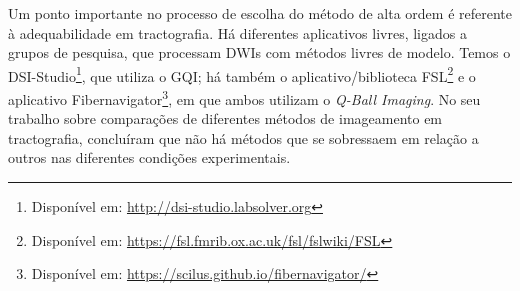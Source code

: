 \documentclass[
    12pt,                %
    oneside,            %
    a4paper,            %
    english,            %
    french,                %
    spanish,            %
    brazil                %
    ]{abntex2}
\begin{document}
Um ponto importante no processo de escolha do método de alta ordem é referente à adequabilidade em tractografia. Há diferentes aplicativos livres, ligados a grupos de pesquisa, que processam DWIs com métodos livres de modelo. Temos o DSI-Studio\footnote{Disponível em: \url{http://dsi-studio.labsolver.org}}, que utiliza o GQI; há também o aplicativo/biblioteca FSL\footnote{Disponível em: \url{https://fsl.fmrib.ox.ac.uk/fsl/fslwiki/FSL}} e o aplicativo Fibernavigator\footnote{Disponível em: \url{https://scilus.github.io/fibernavigator/}}, em que ambos utilizam o \textit{Q-Ball Imaging}. No seu trabalho sobre comparações de diferentes métodos de imageamento em tractografia,  concluíram que não há métodos que se sobressaem em relação a outros nas diferentes condições experimentais.















\end{document}
